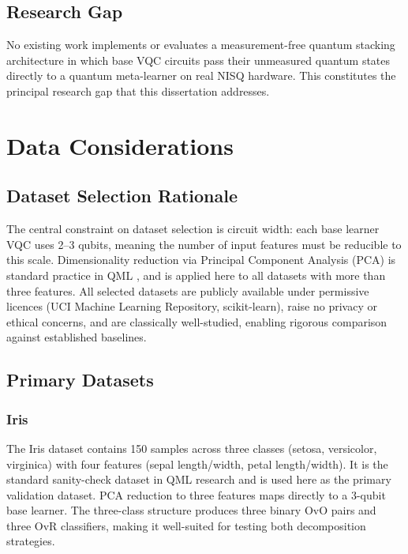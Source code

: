 \documentclass[]{UCD_CS_FYP_Report}
\begin{document}
\section{Research Gap}

No existing work implements or evaluates a measurement-free quantum stacking architecture in which base VQC circuits pass their unmeasured quantum states directly to a quantum meta-learner on real NISQ hardware. This constitutes the principal research gap that this dissertation addresses.

\chapter{Data Considerations}

\section{Dataset Selection Rationale}

The central constraint on dataset selection is circuit width: each base learner VQC uses 2--3 qubits, meaning the number of input features must be reducible to this scale. Dimensionality reduction via Principal Component Analysis (PCA) is standard practice in QML \cite{weigold2021encoding}, and is applied here to all datasets with more than three features. All selected datasets are publicly available under permissive licences (UCI Machine Learning Repository, scikit-learn), raise no privacy or ethical concerns, and are classically well-studied, enabling rigorous comparison against established baselines.

\section{Primary Datasets}

\subsection{Iris}
The Iris dataset contains 150 samples across three classes (setosa, versicolor, virginica) with four features (sepal length/width, petal length/width). It is the standard sanity-check dataset in QML research and is used here as the primary validation dataset. PCA reduction to three features maps directly to a 3-qubit base learner. The three-class structure produces three binary OvO pairs and three OvR classifiers, making it well-suited for testing both decomposition strategies.
\end{document}
